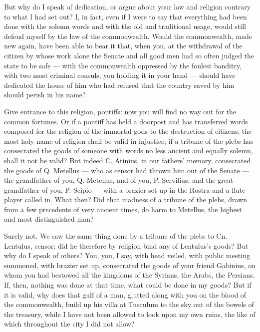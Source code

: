  But why do I speak of dedication, or argue about your law and religion contrary to what I had set out? I, in fact, even if I were to say that everything had been done with the solemn words and with the old and traditional usage, would still defend myself by the law of the commonwealth. Would the commonwealth, made new again, have been able to bear it that, when you, at the withdrawal of the citizen by whose work alone the Senate and all good men had so often judged the state to be safe --- with the commonwealth oppressed by the foulest banditry, with two most criminal consuls, you holding it in your hand --- should have dedicated the house of him who had refused that the country saved by him should perish in his name?

 Give entrance to this religion, pontiffs: now you will find no way out for the common fortunes. Or if a pontiff has held a doorpost and has transferred words composed for the religion of the immortal gods to the destruction of citizens, the most holy name of religion shall be valid in injustice; if a tribune of the plebs has consecrated the goods of someone with words no less ancient and equally solemn, shall it not be valid? But indeed C. Atinius, in our fathers' memory, consecrated the goods of Q. Metellus --- who as censor had thrown him out of the Senate --- the grandfather of you, Q. Metellus, and of you, P. Servilius, and the great-grandfather of you, P. Scipio --- with a brazier set up in the Rostra and a flute-player called in. What then? Did that madness of a tribune of the plebs, drawn from a few precedents of very ancient times, do harm to Metellus, the highest and most distinguished man?

 Surely not. We saw the same thing done by a tribune of the plebs to Cn. Lentulus, censor: did he therefore by religion bind any of Lentulus's goods? But why do I speak of others? You, you, I say, with head veiled, with public meeting summoned, with brazier set up, consecrated the goods of your friend Gabinius, on whom you had bestowed all the kingdoms of the Syrians, the Arabs, the Persians. If, then, nothing was done at that time, what could be done in my goods? But if it is valid, why does that gulf of a man, glutted along with you on the blood of the commonwealth, build up his villa at Tusculum to the sky out of the bowels of the treasury, while I have not been allowed to look upon my own ruins, the like of which throughout the city I did not allow?

